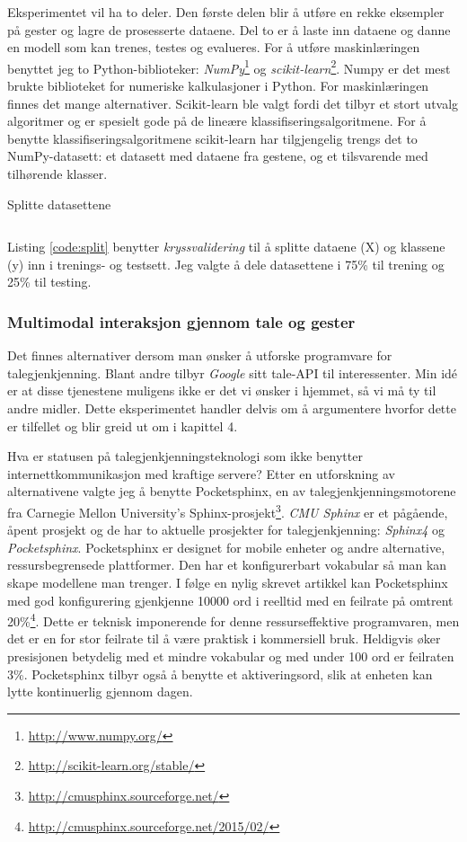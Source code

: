 Eksperimentet vil ha to deler. Den første delen blir å utføre en rekke eksempler på gester og lagre de prosesserte dataene. Del to er å laste inn dataene og danne en modell som kan trenes, testes og evalueres. For å utføre maskinlæringen benyttet jeg to Python-biblioteker: \emph{NumPy}\footnote{\url{http://www.numpy.org/}} og \emph{scikit-learn}\footnote{\url{http://scikit-learn.org/stable/}}. Numpy er det mest brukte biblioteket for numeriske kalkulasjoner i Python. For maskinlæringen finnes det mange alternativer. Scikit-learn ble valgt fordi det tilbyr et stort utvalg algoritmer og er spesielt gode på de lineære klassifiseringsalgoritmene. For å benytte klassifiseringsalgoritmene scikit-learn har tilgjengelig trengs det to NumPy-datasett: et datasett med dataene fra gestene, og et tilsvarende med tilhørende klasser.
\begin{listing}[ht]
\caption{Splitte datasettene}
\inputminted[fontsize=\footnotesize]{python}{kodesnutter/split_data.py}
\label{code:split}
\end{listing}
Listing \ref{code:split} benytter \emph{kryssvalidering} til å splitte dataene (X) og klassene (y) inn i trenings- og testsett. Jeg valgte å dele datasettene i 75\% til trening og 25\% til testing.\\

\subsubsection{Multimodal interaksjon gjennom tale og gester}
\label{ch:multimodalimpl}
Det finnes alternativer dersom man ønsker å utforske programvare for talegjenkjenning. Blant andre tilbyr \emph{Google} sitt tale-API til interessenter. Min idé er at disse tjenestene muligens ikke er det vi ønsker i hjemmet, så vi må ty til andre midler. Dette eksperimentet handler delvis om å argumentere hvorfor dette er tilfellet og blir greid ut om i kapittel 4. 

Hva er statusen på talegjenkjenningsteknologi som ikke benytter internettkommunikasjon med kraftige servere? Etter en utforskning av alternativene valgte jeg å benytte Pocketsphinx, en av talegjenkjenningsmotorene fra Carnegie Mellon University's Sphinx-prosjekt\footnote{\url{http://cmusphinx.sourceforge.net/}}. \emph{CMU Sphinx} er et pågående, åpent prosjekt og de har to aktuelle prosjekter for talegjenkjenning: \emph{Sphinx4} og \emph{Pocketsphinx}. Pocketsphinx er designet for mobile enheter og andre alternative, ressursbegrensede plattformer. Den har et konfigurerbart vokabular så man kan skape modellene man trenger. I følge en nylig skrevet artikkel kan Pocketsphinx med god konfigurering gjenkjenne 10000 ord i reelltid med en feilrate på omtrent 20\%\footnote{\url{http://cmusphinx.sourceforge.net/2015/02/}}. Dette er teknisk imponerende for denne ressurseffektive programvaren, men det er en for stor feilrate til å være praktisk i kommersiell bruk. Heldigvis øker presisjonen betydelig med et mindre vokabular og med under 100 ord er feilraten 3\%. Pocketsphinx tilbyr også å benytte et aktiveringsord, slik at enheten kan lytte kontinuerlig gjennom dagen.

